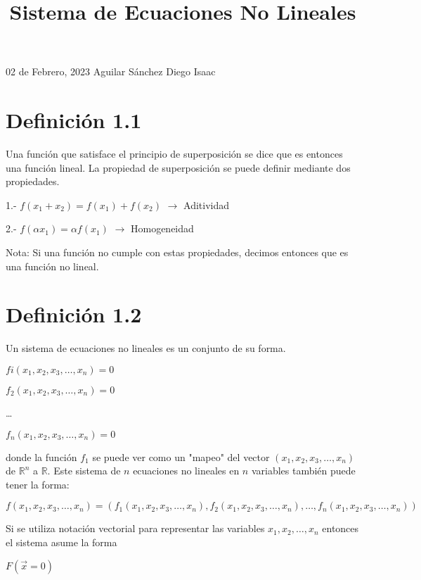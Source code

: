\documentclass[12pt]{article}
\begin{document}
    \begin{flushright}
        02 de Febrero, 2023 \linebreak
        Aguilar Sánchez Diego Isaac
    \end{flushright}
    \title{Sistema de Ecuaciones No Lineales}
    \section*{Definición 1.1}
    Una función que satisface el principio de superposición se dice que es entonces una función lineal. La propiedad de superposición se puede definir mediante dos propiedades.
    \begin{center}
        1.- {$f(x_{1} + x_{2}) = f(x_{1}) + f(x_{2})$} $\rightarrow$ Aditividad
    \end{center}
    \begin{center}
        2.- {$f(\alpha x_{1}) = \alpha f(x_{1})$} $\rightarrow$ Homogeneidad
    \end{center}
    \small{Nota: Si una función no cumple con estas propiedades, decimos entonces que es una función no lineal.}
    \section*{Definición 1.2}
    Un sistema de ecuaciones no lineales es un conjunto de su forma.
    \begin{center}
        $fi(x_{1}, x_{2}, x_{3}, \dots, x_{n}) = 0$
    \end{center}
    \begin{center}
        $f_{2}(x_{1}, x_{2}, x_{3}, \dots, x_{n}) = 0$
    \end{center}
    \begin{center}
        \dots
    \end{center}
    \begin{center}
        $f_{n}(x_{1}, x_{2}, x_{3}, \dots, x_{n}) = 0$
    \end{center}
    donde la función $f_{1}$ se puede ver como un "mapeo" del vector $(x_{1}, x_{2}, x_{3}, \dots, x_{n})$ de $\mathbb{R}^{n}$ a $\mathbb{R}$.  Este sistema de $n$ ecuaciones no lineales en $n$ variables también puede tener la forma:
    \begin{center}
        $f(x_{1}, x_{2}, x_{3}, \dots, x_{n})
        =(f_{1}(x_{1}, x_{2}, x_{3}, \dots, x_{n}), f_{2}(x_{1}, x_{2}, x_{3}, \dots, x_{n}),\dots, f_{n}(x_{1}, x_{2}, x_{3}, \dots, x_{n}))$

    \end{center} 
    Si se utiliza notación vectorial para representar las variables $x_{1}, x_{2}, \dots, x_{n}$ entonces el sistema asume la forma 
    \begin{center}
        $F(\overrightarrow{x} = 0 )$
    \end{center}
\end{document}
